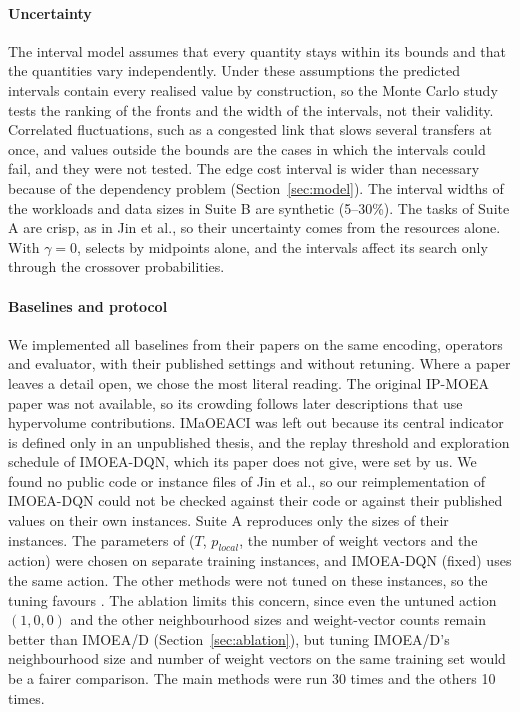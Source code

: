 \paragraph{Uncertainty}
The interval model assumes that every quantity stays within its bounds and that the quantities vary independently.
Under these assumptions the predicted intervals contain every realised value by construction, so the Monte Carlo study
tests the ranking of the fronts and the width of the intervals, not their validity. Correlated fluctuations, such as a
congested link that slows several transfers at once, and values outside the bounds are the cases in which the
intervals could fail, and they were not tested. The edge cost interval is wider than necessary because of the
dependency problem (Section~\ref{sec:model}). The interval widths of the workloads and data sizes in Suite B are
synthetic (5--30\%). The tasks of Suite A are crisp, as in Jin et al., so their uncertainty comes from the resources
alone. With $\gamma = 0$, \ours{} selects by midpoints alone, and the intervals affect its search only through the
crossover probabilities.

\paragraph{Baselines and protocol}
We implemented all baselines from their papers on the same encoding, operators and evaluator, with their published
settings and without retuning. Where a paper leaves a detail open, we chose the most literal reading. The original
IP-MOEA paper was not available, so its crowding follows later descriptions that use hypervolume contributions.
IMaOEACI was left out because its central indicator is defined only in an unpublished thesis, and the replay threshold
and exploration schedule of IMOEA-DQN, which its paper does not give, were set by us. We found no public code
or instance files of Jin et al., so our reimplementation of IMOEA-DQN could not be checked against their code or
against their published values on their own instances. Suite A reproduces only the sizes of their instances. The parameters of \ours{} ($T$, $p_{local}$, the number of
weight vectors and the action) were chosen on separate training instances, and IMOEA-DQN (fixed) uses the same action.
The other methods were not tuned on these instances, so the tuning favours \ours{}. The ablation limits this concern,
since even the untuned action $(1, 0, 0)$ and the other neighbourhood sizes and weight-vector counts remain better than
IMOEA/D (Section~\ref{sec:ablation}), but tuning IMOEA/D's neighbourhood size and number of weight vectors on the same
training set would be a fairer comparison. The main methods were run 30 times and the others 10 times.

